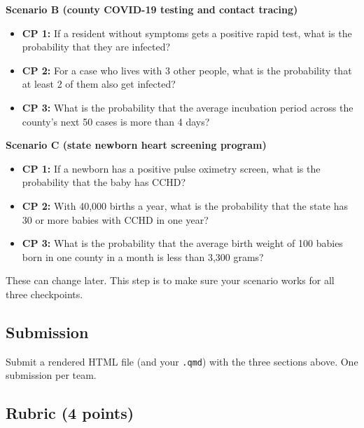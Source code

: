 \documentclass[
  letterpaper,
  DIV=11,
  numbers=noendperiod]{scrartcl}
\providecommand{\tightlist}{%
  \setlength{\itemsep}{0pt}\setlength{\parskip}{0pt}}
\begin{document}
\textbf{Scenario B (county COVID-19 testing and contact tracing)}

\begin{itemize}
\tightlist
\item
  \textbf{CP 1:} If a resident without symptoms gets a positive rapid
  test, what is the probability that they are infected?
\item
  \textbf{CP 2:} For a case who lives with 3 other people, what is the
  probability that at least 2 of them also get infected?
\item
  \textbf{CP 3:} What is the probability that the average incubation
  period across the county's next 50 cases is more than 4 days?
\end{itemize}

\textbf{Scenario C (state newborn heart screening program)}

\begin{itemize}
\tightlist
\item
  \textbf{CP 1:} If a newborn has a positive pulse oximetry screen, what
  is the probability that the baby has CCHD?
\item
  \textbf{CP 2:} With 40,000 births a year, what is the probability that
  the state has 30 or more babies with CCHD in one year?
\item
  \textbf{CP 3:} What is the probability that the average birth weight
  of 100 babies born in one county in a month is less than 3,300 grams?
\end{itemize}

These can change later. This step is to make sure your scenario works
for all three checkpoints.

\subsection{Submission}\label{submission}

Submit a rendered HTML file (and your \texttt{.qmd}) with the three
sections above. One submission per team.

\subsection{Rubric (4 points)}\label{rubric-4-points}
\end{document}
